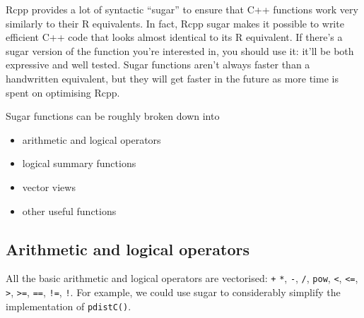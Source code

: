 
Rcpp provides a lot of syntactic ``sugar'' to ensure that C++ functions
work very similarly to their R equivalents. In fact, Rcpp sugar makes it
possible to write efficient C++ code that looks almost identical to its
R equivalent. If there's a sugar version of the function you're
interested in, you should use it: it'll be both expressive and well
tested. Sugar functions aren't always faster than a handwritten
equivalent, but they will get faster in the future as more time is spent
on optimising Rcpp.

Sugar functions can be roughly broken down into

\begin{itemize}
\itemsep1pt\parskip0pt
\item
  arithmetic and logical operators
\item
  logical summary functions
\item
  vector views
\item
  other useful functions
\end{itemize}

\subsection{Arithmetic and logical operators}

All the basic arithmetic and logical operators are vectorised:
\texttt{+} \texttt{*}, \texttt{-}, \texttt{/}, \texttt{pow},
\texttt{\textless{}}, \texttt{\textless{}=}, \texttt{\textgreater{}},
\texttt{\textgreater{}=}, \texttt{==}, \texttt{!=}, \texttt{!}. For
example, we could use sugar to considerably simplify the implementation
of \texttt{pdistC()}.

\begin{Shaded}
\begin{Highlighting}[]
\StringTok{ }
  \StringTok{ }\StringTok{ }\NormalTok{)}
\NormalTok{\}}
\end{Highlighting}
\end{Shaded}

\begin{Shaded}
\begin{Highlighting}[]
  

 
   \NormalTok{));}
\NormalTok{\}}
\end{Highlighting}
\end{Shaded}

